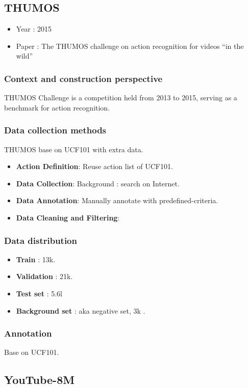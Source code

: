 \documentclass[10pt,onecolumn,letterpaper]{article}
\begin{document}
\subsection{THUMOS}

\begin{itemize}
	\item Year : 2015
	\item Paper : The THUMOS challenge on action recognition for videos “in the wild”
\end{itemize}

\subsubsection{Context and construction perspective}

THUMOS Challenge is a competition held from 2013 to 2015, serving as a benchmark for action recognition.

\subsubsection{Data collection methods}
THUMOS base on UCF101 with extra data.
\begin{itemize}
	\item \textbf{Action Definition}: Reuse action list of UCF101.
	\item \textbf{Data Collection}: Background : search on Internet.
	\item \textbf{Data Annotation}: Manually annotate with predefined-criteria.
	\item \textbf{Data Cleaning and Filtering}: 
\end{itemize}
\subsubsection{Data distribution}
\begin{itemize}
	\item  \textbf{Train} : 13k.
	\item \textbf{Validation} : 21k.
	\item \textbf{Test set} : 5.6l
	\item \textbf{Background set} : aka negative set, 3k .
\end{itemize}
\subsubsection{Annotation}
Base on UCF101.

\subsection{YouTube-8M}
\end{document}
